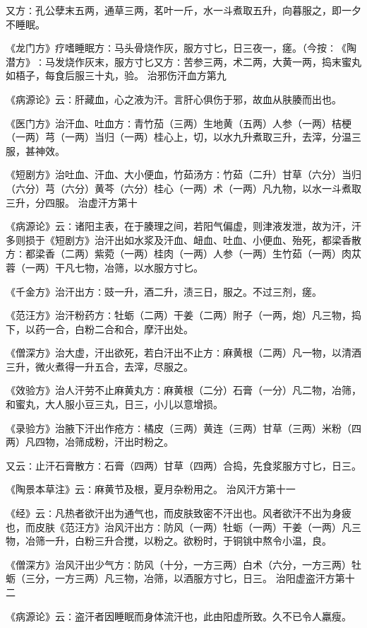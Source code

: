 \documentclass[a4paper,12pt,UTF8,twoside]{ctexbook}
\begin{document}
又方∶孔公孽末五两，通草三两，茗叶一斤，水一斗煮取五升，向暮服之，即一夕不睡眠。

《龙门方》疗嗜睡眠方∶马头骨烧作灰，服方寸匕，日三夜一，瘥。（今按∶《陶潜方》∶马发烧作灰末，服方寸匕又方∶苦参三两，术二两，大黄一两，捣末蜜丸如梧子，每食后服三十丸，验。
治邪伤汗血方第九

《病源论》云∶肝藏血，心之液为汗。言肝心俱伤于邪，故血从肤腠而出也。

《医门方》治汗血、吐血方∶青竹茄（三两）生地黄（五两）人参（一两）桔梗（一两）芎（一两）当归（一两）桂心上，切，以水九升煮取三升，去滓，分温三服，甚神效。

《短剧方》治吐血、汗血、大小便血，竹茹汤方∶竹茹（二升）甘草（六分）当归（六分）芎（六分）黄芩（六分）桂心（一两）术（一两）凡九物，以水一斗煮取三升，分四服。
治虚汗方第十

《病源论》云∶诸阳主表，在于腠理之间，若阳气偏虚，则津液发泄，故为汗，汗多则损于《短剧方》治汗出如水浆及汗血、衄血、吐血、小便血、殆死，都梁香散方∶都梁香（二两）紫菀（一两）桂肉（一两）人参（一两）生竹茹（一两）肉苁蓉（一两）干凡七物，冶筛，以水服方寸匕。

《千金方》治汗出方∶豉一升，酒二升，渍三日，服之。不过三剂，瘥。

《范汪方》治汗粉药方∶牡蛎（二两）干姜（二两）附子（一两，炮）凡三物，捣下，以药一合，白粉二合和合，摩汗出处。

《僧深方》治大虚，汗出欲死，若白汗出不止方∶麻黄根（二两）凡一物，以清酒三升，微火煮得一升五合，去滓，尽服之。

《效验方》治人汗劳不止麻黄丸方∶麻黄根（二分）石膏（一分）凡二物，冶筛，和蜜丸，大人服小豆三丸，日三，小儿以意增损。

《录验方》治腋下汗出作疮方∶橘皮（三两）黄连（三两）甘草（三两）米粉（四两）凡四物，冶筛成粉，汗出时粉之。

又云∶止汗石膏散方∶石膏（四两）甘草（四两）合捣，先食浆服方寸匕，日三。

《陶景本草注》云∶麻黄节及根，夏月杂粉用之。
治风汗方第十一

《经》云∶凡热者欲汗出为通气也，而皮肤致密不汗出也。风者欲汗不出为身疲也，而皮肤《范汪方》治风汗出方∶防风（一两）牡蛎（一两）干姜（一两）凡三物，冶筛一升，白粉三升合搅，以粉之。欲粉时，于铜铫中熬令小温，良。

《僧深方》治风汗出少气方∶防风（十分，一方三两）白术（六分，一方三两）牡蛎（三分，一方三两）凡三物，冶筛，以酒服方寸匕，日三。
治阳虚盗汗方第十二

《病源论》云∶盗汗者因睡眠而身体流汗也，此由阳虚所致。久不已令人羸瘦。
\end{document}
